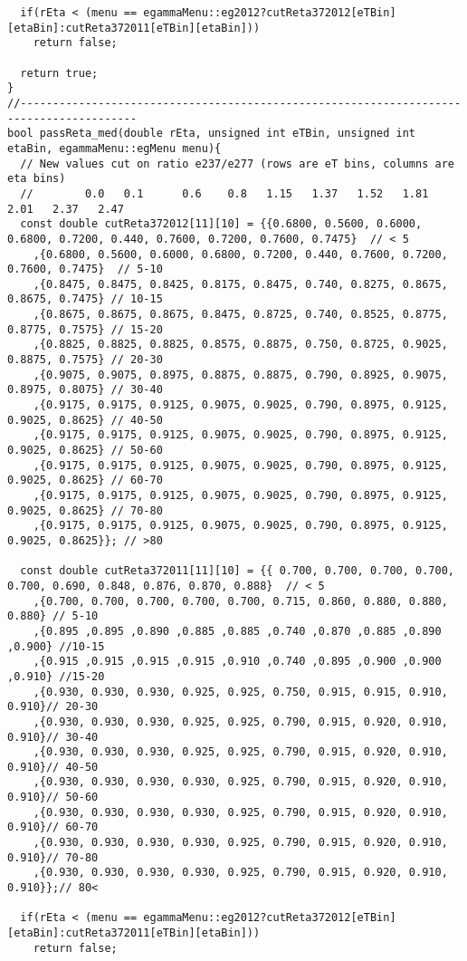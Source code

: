 \begin{lstlisting}
  if(rEta < (menu == egammaMenu::eg2012?cutReta372012[eTBin][etaBin]:cutReta372011[eTBin][etaBin]))
    return false;

  return true;
}
//----------------------------------------------------------------------------------------
bool passReta_med(double rEta, unsigned int eTBin, unsigned int etaBin, egammaMenu::egMenu menu){
  // New values cut on ratio e237/e277 (rows are eT bins, columns are eta bins)
  //        0.0   0.1      0.6    0.8   1.15   1.37   1.52   1.81    2.01   2.37   2.47
  const double cutReta372012[11][10] = {{0.6800, 0.5600, 0.6000, 0.6800, 0.7200, 0.440, 0.7600, 0.7200, 0.7600, 0.7475}  // < 5
	,{0.6800, 0.5600, 0.6000, 0.6800, 0.7200, 0.440, 0.7600, 0.7200, 0.7600, 0.7475}  // 5-10
	,{0.8475, 0.8475, 0.8425, 0.8175, 0.8475, 0.740, 0.8275, 0.8675, 0.8675, 0.7475} // 10-15
	,{0.8675, 0.8675, 0.8675, 0.8475, 0.8725, 0.740, 0.8525, 0.8775, 0.8775, 0.7575} // 15-20
	,{0.8825, 0.8825, 0.8825, 0.8575, 0.8875, 0.750, 0.8725, 0.9025, 0.8875, 0.7575} // 20-30
	,{0.9075, 0.9075, 0.8975, 0.8875, 0.8875, 0.790, 0.8925, 0.9075, 0.8975, 0.8075} // 30-40
	,{0.9175, 0.9175, 0.9125, 0.9075, 0.9025, 0.790, 0.8975, 0.9125, 0.9025, 0.8625} // 40-50
	,{0.9175, 0.9175, 0.9125, 0.9075, 0.9025, 0.790, 0.8975, 0.9125, 0.9025, 0.8625} // 50-60
	,{0.9175, 0.9175, 0.9125, 0.9075, 0.9025, 0.790, 0.8975, 0.9125, 0.9025, 0.8625} // 60-70
	,{0.9175, 0.9175, 0.9125, 0.9075, 0.9025, 0.790, 0.8975, 0.9125, 0.9025, 0.8625} // 70-80
	,{0.9175, 0.9175, 0.9125, 0.9075, 0.9025, 0.790, 0.8975, 0.9125, 0.9025, 0.8625}}; // >80
				    
  const double cutReta372011[11][10] = {{ 0.700, 0.700, 0.700, 0.700, 0.700, 0.690, 0.848, 0.876, 0.870, 0.888}  // < 5
	,{0.700, 0.700, 0.700, 0.700, 0.700, 0.715, 0.860, 0.880, 0.880, 0.880} // 5-10
	,{0.895 ,0.895 ,0.890 ,0.885 ,0.885 ,0.740 ,0.870 ,0.885 ,0.890 ,0.900} //10-15
	,{0.915 ,0.915 ,0.915 ,0.915 ,0.910 ,0.740 ,0.895 ,0.900 ,0.900 ,0.910} //15-20
	,{0.930, 0.930, 0.930, 0.925, 0.925, 0.750, 0.915, 0.915, 0.910, 0.910}// 20-30
	,{0.930, 0.930, 0.930, 0.925, 0.925, 0.790, 0.915, 0.920, 0.910, 0.910}// 30-40
	,{0.930, 0.930, 0.930, 0.925, 0.925, 0.790, 0.915, 0.920, 0.910, 0.910}// 40-50
	,{0.930, 0.930, 0.930, 0.930, 0.925, 0.790, 0.915, 0.920, 0.910, 0.910}// 50-60
	,{0.930, 0.930, 0.930, 0.930, 0.925, 0.790, 0.915, 0.920, 0.910, 0.910}// 60-70
	,{0.930, 0.930, 0.930, 0.930, 0.925, 0.790, 0.915, 0.920, 0.910, 0.910}// 70-80
	,{0.930, 0.930, 0.930, 0.930, 0.925, 0.790, 0.915, 0.920, 0.910, 0.910}};// 80<

  if(rEta < (menu == egammaMenu::eg2012?cutReta372012[eTBin][etaBin]:cutReta372011[eTBin][etaBin]))
    return false;


\end{lstlisting}
